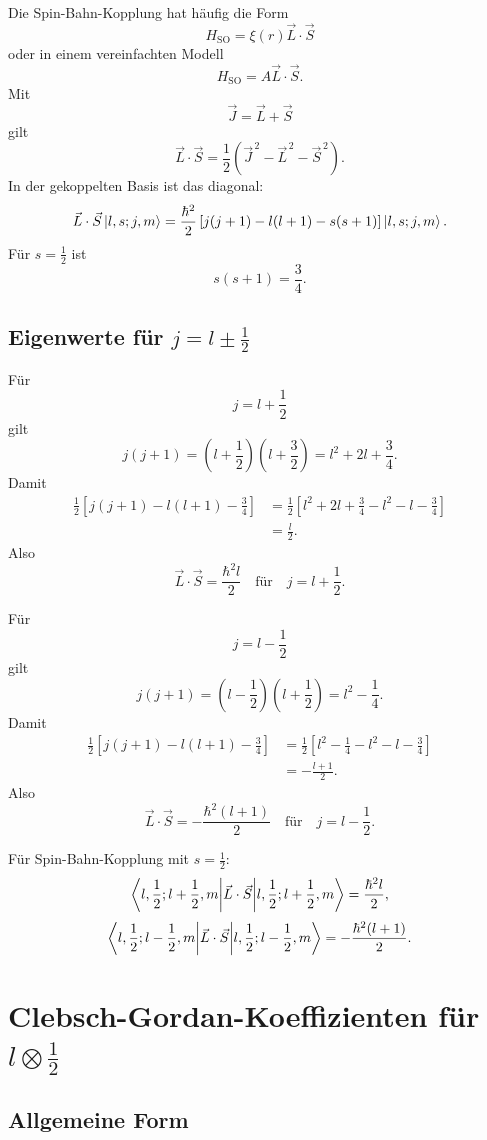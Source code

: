 Die Spin-Bahn-Kopplung hat häufig die Form
\[
    H_{\mathrm{SO}}=\xi(r)\vec L\cdot\vec S
\]
oder in einem vereinfachten Modell
\[
    H_{\mathrm{SO}}=A\vec L\cdot\vec S.
\]
Mit
\[
    \vec J=\vec L+\vec S
\]
gilt
\[
    \vec L\cdot\vec S
    =\frac12(\vec J^{\,2}-\vec L^{\,2}-\vec S^{\,2}).
\]
In der gekoppelten Basis ist das diagonal:
\[
    \vec L\cdot\vec S\left|l,s;j,m\right\rangle
    =\frac{\hbar^2}{2}\left[j(j+1)-l(l+1)-s(s+1)\right]\left|l,s;j,m\right\rangle.
\]
Für \(s=\frac12\) ist
\[
    s(s+1)=\frac34.
\]

\subsection{Eigenwerte für \texorpdfstring{\(j=l\pm\frac12\)}{j=l±1/2}}

Für
\[
    j=l+\frac12
\]
gilt
\[
    j(j+1)=\left(l+\frac12\right)\left(l+\frac32\right)
    =l^2+2l+\frac34.
\]
Damit
\begin{align*}
    \frac12\left[j(j+1)-l(l+1)-\frac34\right]
    &=\frac12\left[l^2+2l+\frac34-l^2-l-\frac34\right]\\
    &=\frac l2.
\end{align*}
Also
\[
    \vec L\cdot\vec S = \frac{\hbar^2 l}{2}
    \quad \text{für} \quad j=l+\frac12.
\]

Für
\[
    j=l-\frac12
\]
gilt
\[
    j(j+1)=\left(l-\frac12\right)\left(l+\frac12\right)=l^2-\frac14.
\]
Damit
\begin{align*}
    \frac12\left[j(j+1)-l(l+1)-\frac34\right]
    &=\frac12\left[l^2-\frac14-l^2-l-\frac34\right]\\
    &=-\frac{l+1}{2}.
\end{align*}
Also
\[
    \vec L\cdot\vec S = -\frac{\hbar^2(l+1)}{2}
    \quad \text{für} \quad j=l-\frac12.
\]

\begin{formulabox}
Für Spin-Bahn-Kopplung mit \(s=\frac12\):
\[
    \left\langle l,\frac12;l+\frac12,m\middle|\vec L\cdot\vec S\middle|l,\frac12;l+\frac12,m\right\rangle
    =\frac{\hbar^2l}{2},
\]
\[
    \left\langle l,\frac12;l-\frac12,m\middle|\vec L\cdot\vec S\middle|l,\frac12;l-\frac12,m\right\rangle
    =-\frac{\hbar^2(l+1)}{2}.
\]
\end{formulabox}

\section{Clebsch-Gordan-Koeffizienten für \texorpdfstring{\(l\otimes\frac12\)}{l tensor 1/2}}

\subsection{Allgemeine Form}

